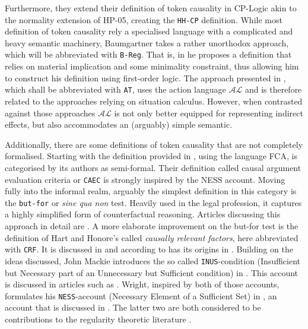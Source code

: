 \documentclass[11pt,a4paper]{book}
\theoremstyle{definition}
\theoremstyle{definition}
\theoremstyle{definition}
\theoremstyle{remark}
\begin{document}
Furthermore, they extend their definition of token causality in CP-Logic akin to the normality extension of HP-05, creating the \texttt{HH-CP} definition.
While most definition of token causality rely a specialised language with a complicated and heavy semantic machinery, Baumgartner takes a rather unorthodox approach, which will be abbreviated with \texttt{B-Reg}. That is, in 
\parencite{baumgartner2013regularity} he proposes a definition that relies on material implication and some minimality constraint, thus allowing him to construct his definition using first-order logic.
The approach presented in \parencite{leblanc2019explaining}, which shall be abbreviated with \texttt{AT}, uses the action language $\mathcal{AL}$ and is therefore related to the approaches relying on situation calculus. However, when contrasted against those approaches $\mathcal{AL}$ is not only better equipped for representing indirect effects, but also accommodates an (arguably) simple semantic.

Additionally, there are some definitions of token causality that are not completely formalised.  
Starting with the definition provided in \parencite{liepicna2019evaluation}, using the language FCA, is categorised by its authors as semi-formal. Their definition called causal argument evaluation criteria or \texttt{CAEC} is strongly inspired by the NESS account.
Moving fully into the informal realm, arguably the simplest definition in this category is the \texttt{but-for} or \emph{sine qua non} test. Heavily used in the legal profession, it captures a highly simplified form of counterfactual reasoning. Articles discussing this approach in detail are \parencite{gerstenberg2010spreading,liepicna2020arguing,wright2017ness}.  
A more elaborate improvement on the but-for test is the definition of Hart and Honore's called \emph{causally relevant factors}, here abbreviated with \texttt{CRF}. It is discussed in \parencite{liepicna2020arguing,wright2017ness} and according to \parencite{wright2017ness} has its origins in \parencite{hart1985causation}. 
Building on the ideas discussed, John Mackie introduces the so called \texttt{INUS}-condition (Insufficient but Necessary part of an Unnecessary but Sufficient condition) in \parencite{mackie1965causes}. This account is discussed in articles such as \parencite{wright2017ness,baumgartner2013regularity}.
Wright, inspired by both of those accounts, formulates his \texttt{NESS}-account (Necessary Element of a Sufficient Set) in \parencite{wright1987causation}, an account that is discussed in \parencite{wright2017ness,baumgartner2013regularity,bochman2018actual}.
The latter two are both considered to be contributions to the regularity theoretic literature \parencite{baumgartner2013regularity}.
\end{document}
